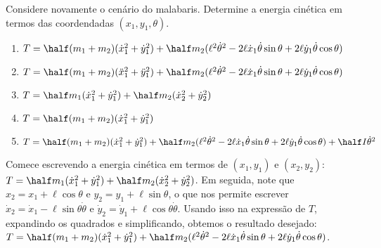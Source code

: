 \begin{question}
  	Considere novamente o cenário do malabaris.
  	Determine a energia cinética em termos das coordendadas $(x_1,y_1,\theta)$.

  	\begin{enumerate}
  		\item $T = \half(m_1 + m_2)(\dot x_1^2 + \dot y_1^2) + \half m_2 (\ell^2 \dot\theta^2 - 2\ell \dot x_1 \dot\theta \sin\theta + 2\ell \dot y_1 \dot\theta \cos\theta)$ \rightanswer
  		\item $T = \half(m_1 + m_2)(\ddot x_1^2 + \ddot y_1^2) + \half m_2 (\ell^2 \dot\theta^2 - 2\ell \dot x_1 \dot\theta \sin\theta + 2\ell \dot y_1 \dot\theta \cos\theta)$
  		\item $T = \half m_1(\dot x_1^2 + \dot y_1^2) + \half m_2 (\dot x_2^2 + \dot y_2^2)$
  		\item $T = \half(m_1 + m_2)(\dot x_1^2 + \dot y_1^2)$
  		\item $T = \half(m_1 + m_2)(\dot x_1^2 + \dot y_1^2) + \half m_2 (\ell^2 \dot\theta^2 - 2\ell \dot x_1 \dot\theta \sin\theta + 2\ell \dot y_1 \dot\theta \cos\theta) + \half I \dot\theta^2$
  	\end{enumerate}

    \begin{solution}
      Comece escrevendo a energia cinética em termos de $(x_1, y_1)$ e $(x_2, y_2)$: $T = \half m_1 (\dot x_1^2 + \dot y_1^2) + \half m_2 (\dot x_2^2 + \dot y_2^2)$.
      Em seguida, note que $x_2 = x_1 + \ell \cos \theta$ e $y_2 = y_1 + \ell \sin \theta$, o que nos permite escrever $\dot x_2 = \dot x_1 - \ell \sin \theta \dot \theta$ e $\dot y_2 = \dot y_1 + \ell \cos\theta \dot\theta$.
      Usando isso na expressão de $T$, expandindo os quadrados e simplificando, obtemos o resultado desejado: $T = \half(m_1 + m_2)(\dot x_1^2 + \dot y_1^2) + \half m_2 (\ell^2 \dot\theta^2 - 2\ell \dot x_1 \dot\theta \sin\theta + 2\ell \dot y_1 \dot\theta \cos\theta)$.
    \end{solution}
\end{question}